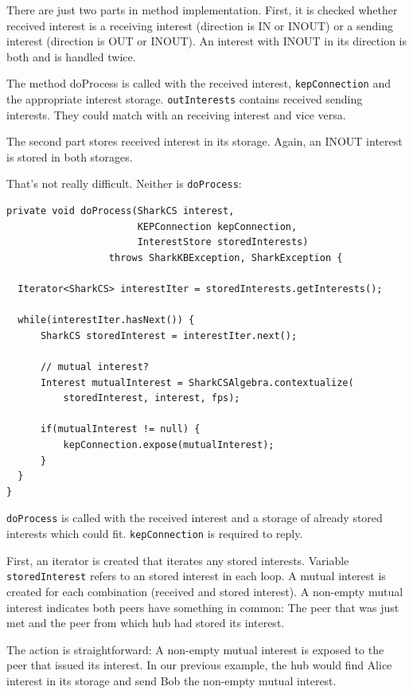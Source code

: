{There are just two parts in method implementation. First, it is checked whether received interest is a receiving interest (direction is IN or INOUT) or a
sending interest (direction is OUT or INOUT). An interest with INOUT in its direction is both and is handled twice. 

The method doProcess is called with the received interest, {\tt kepConnection} and the appropriate interest storage. {\tt outInterests} contains received sending interests. They could match with an receiving interest and vice versa.

The second part stores received interest in its storage. Again, an INOUT interest is stored in both storages.

That's not really difficult. Neither is {\tt doProcess}:

\begin{verbatim}
private void doProcess(SharkCS interest, 
                       KEPConnection kepConnection, 
                       InterestStore storedInterests) 
                  throws SharkKBException, SharkException {

  Iterator<SharkCS> interestIter = storedInterests.getInterests();

  while(interestIter.hasNext()) {
      SharkCS storedInterest = interestIter.next();

      // mutual interest?
      Interest mutualInterest = SharkCSAlgebra.contextualize(
          storedInterest, interest, fps);

      if(mutualInterest != null) {
          kepConnection.expose(mutualInterest);
      }
  }
}
\end{verbatim}

{\tt doProcess} is called with the received interest and a storage of already stored interests which could fit. {\tt kepConnection} is required to reply.

First, an iterator is created that iterates any stored interests. Variable 
{\tt storedInterest} refers to an stored interest in each loop. A mutual interest is created for each combination (received and stored interest).
A non-empty mutual interest indicates both peers have something in common: The peer that was just met and the peer from which hub had stored its interest. 

The action is straightforward: A non-empty mutual interest is exposed to
the peer that issued its interest. In our previous example, the hub would find Alice interest in its storage and send Bob the non-empty mutual interest.

}
